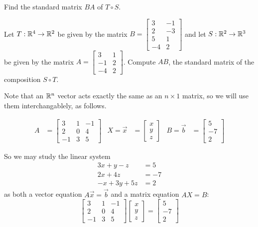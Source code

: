 \begin{applicationActivities}
\begin{activity}{5}
Find the standard matrix \(BA\) of $T \circ S$.
\end{activity}

\begin{activity}{10}
Let \(T: \mathbb{R}^4 \rightarrow \mathbb{R}^2\) be given by the matrix \(B=\begin{bmatrix} 3 & -1 \\ 2 & -3 \\ 5 & 1 \\ -4 & 2 \end{bmatrix} \) and let \(S: \mathbb{R}^2 \rightarrow \mathbb{R}^3\) be given by the matrix \(A = \begin{bmatrix} 3 & 1 \\ -1 & 2 \\ -4 & 2 \end{bmatrix}\).  Compute \(AB\), the standard matrix of the composition \(S \circ T\).
\end{activity}

\begin{observation}
Note that an \(\mathbb{R}^n\) vector acts exactly the same as an \(n\times 1\)
matrix, so we will use them interchangablely, as follows.

\begin{align*}
A&=\begin{bmatrix} 3 & 1 & -1 \\ 2 & 0 & 4 \\ -1 & 3 & 5  \end{bmatrix} & X=\vec{x}&=\begin{bmatrix} x  \\ y \\ z  \end{bmatrix} & B=\vec{b} &= \begin{bmatrix} 5 \\ -7 \\ 2 \end{bmatrix}
\end{align*}

So we may study the linear system
\begin{align*}
3x+y-z &= 5 \\ 2x+4z &= -7 \\ -x+3y+5z &=2
\end{align*}
as both a vector equation \(A\vec{x}=\vec{b}\) and a matrix equation
\(AX=B\):
\[
  \begin{bmatrix} 3 & 1 & -1 \\ 2 & 0 & 4 \\ -1 & 3 & 5  \end{bmatrix}
  \begin{bmatrix} x  \\ y \\ z  \end{bmatrix}
    =
  \begin{bmatrix} 5 \\ -7 \\ 2 \end{bmatrix}
\]
\end{observation}



\end{applicationActivities}
